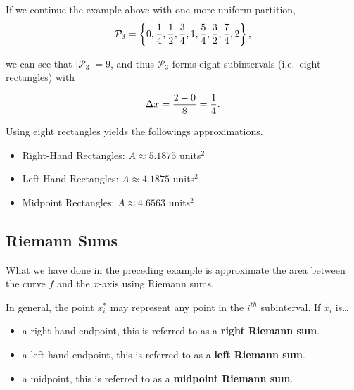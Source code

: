 \documentclass[12pt]{article}
\begin{document}
\newpage

If we continue the example above with one more uniform partition, 
$$\mathcal{P}_3=\left\{ 0, \frac{1}{4},\frac{1}{2},\frac{3}{4},1,\frac{5}{4},\frac{3}{2},\frac{7}{4},2\right\},$$

we can see that $\big|\mathcal{P}_3\big|=9$, and thus $\mathcal{P}_3$ forms eight subintervals (i.e.\ eight rectangles) with 

$$\Delta x=\displaystyle\frac{2-0}{8}=\frac{1}{4}.$$

\vspace{3mm}

Using eight rectangles yields the followings approximations.
\begin{itemize}
	\item Right-Hand Rectangles: $A\approx 5.1875$ units$^2$
	\item Left-Hand Rectangles: $A\approx 4.1875$ units$^2$
	\item Midpoint Rectangles: $A\approx 4.6563$ units$^2$
\end{itemize}

\vspace{5mm}

\subsection*{Riemann Sums}

What we have done in the preceding example is approximate the area between the curve $f$ and the $x$-axis using Riemann sums.

\vspace{3mm}


\vspace{5mm}

In general, the point $x_i^*$ may represent any point in the $i^{th}$ subinterval. If $x_i$ is\dots
\begin{itemize}
	\item a right-hand endpoint, this is referred to as a \textbf{right Riemann sum}.
	\item a left-hand endpoint, this is referred to as a \textbf{left Riemann sum}.
	\item a midpoint, this is referred to as a \textbf{midpoint Riemann sum}.
\end{itemize}
\end{document}
